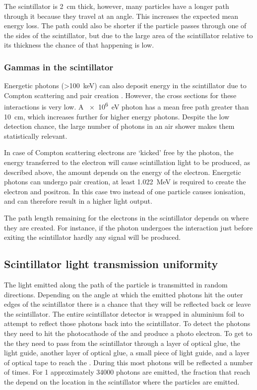 The scintillator is \SI{2}{\centi\meter} thick, however, many particles have a longer path through it because they travel at an angle. This increases the expected mean energy loss. The path could also be shorter if the particle passes through one of the sides of the scintillator, but due to the large area of the scintillator relative to its thickness the chance of that happening is low.


\subsubsection{Gammas in the scintillator}

Energetic photons (\SI{>100}{\keV}) can also deposit energy in the scintillator due to Compton scattering and pair creation \cite{lio2015}. However, the cross sections for these interactions is very low. A \SI{e6}{\eV} photon has a mean free path greater than \SI{10}{\centi\meter}, which increases further for higher energy photons. Despite the low detection chance, the large number of photons in an air shower makes them statistically relevant.

In case of Compton scattering electrons are `kicked' free by the photon, the energy transferred to the electron will cause scintillation light to be produced, as described above, the amount depends on the energy of the electron. Energetic photons can undergo pair creation, at least \SI{1.022}{\MeV} is required to create the electron and positron. In this case two instead of one particle causes ionisation, and can therefore result in a higher light output.

The path length remaining for the electrons in the scintillator depends on where they are created. For instance, if the photon undergoes the interaction just before exiting the scintillator hardly any signal will be produced.


\subsection{Scintillator light transmission uniformity}

The light emitted along the path of the particle is transmitted in random directions. Depending on the angle at which the emitted photons hit the outer edges of the scintillator there is a chance that they will be reflected back or leave the scintillator. The entire scintillator detector is wrapped in aluminium foil to attempt to reflect those photons back into the scintillator. To detect the photons they need to hit the photocathode of the \pmt and produce a photo electron. To get to the \pmt they need to pass from the scintillator through a layer of optical glue, the light guide, another layer of optical glue, a small piece of light guide, and a layer of optical tape to reach the \pmt. During this most photons will be reflected a number of times. For \SI{1}{\mip} approximately \num{34000} photons \cite[sec. 3.1]{lio2010} are emitted, the fraction that reach the \pmt depend on the location in the scintillator where the particles are emitted.

